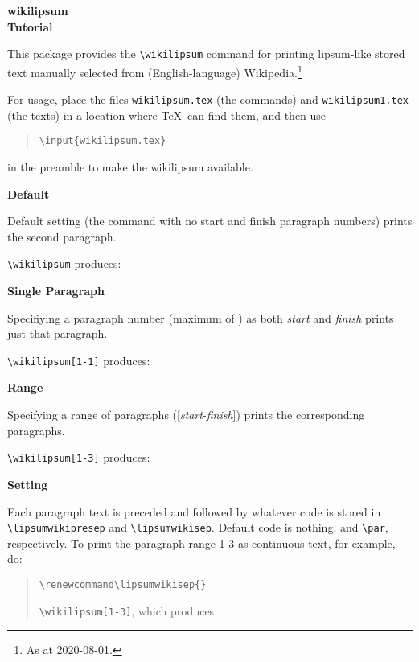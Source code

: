 \documentclass{article}
\newcommand\cmdwl[1]{\texttt{\textbackslash #1}}
\begin{document}
\begin{center}
\bfseries wikilipsum\\
 Tutorial
\end{center}
This package provides the \cmdwl{wikilipsum} command for printing lipsum-like stored text manually selected from (English-language) Wikipedia.\footnote{As at 2020-08-01.} 

For usage, place the files  \texttt{wikilipsum.tex} (the commands) and \texttt{wikilipsum1.tex} (the texts) in a location where \TeX\ can find them, and then use 
\begin{quotation}
\texttt{\cmdwl{input}\{wikilipsum.tex\}} 
\end{quotation}
in the preamble to make the wikilipsum available.
\bigskip

\textbf{Default}

Default setting (the command with no start and finish paragraph numbers) prints the second paragraph.

\cmdwl{wikilipsum} produces:

\begin{quotation}\sffamily\small
\wikilipsum
\end{quotation}
\bigskip

\textbf{Single Paragraph}

Specifiying a paragraph number (maximum of \maxwikilipsum) as both \textit{start} and \textit{finish} prints just that paragraph.

\cmdwl{wikilipsum[1-1]} produces:
\begin{quotation}\sffamily\small
\wikilipsum[1-1]
\end{quotation}
\bigskip

\textbf{Range}

Specifying a range of paragraphs ([\textit{start}-\textit{finish}]) prints the corresponding paragraphs.

\cmdwl{wikilipsum[1-3]} produces:
\begin{quotation}\sffamily\small
\wikilipsum[1-3]
\end{quotation}


\textbf{Setting}

Each paragraph text is preceded and followed by whatever code is stored in \cmdwl{lipsumwikipresep} and \cmdwl{lipsumwikisep}. Default code is nothing, and \cmdwl{par}, respectively. To print the paragraph range 1-3 as continuous text, for example, do:
\begin{quotation}
\texttt{\textbackslash renewcommand\textbackslash lipsumwikisep\{\}}\par
\cmdwl{wikilipsum[1-3]}, which produces:\par
\begin{quotation}\sffamily\small\renewcommand\lipsumwikisep{}\wikilipsum[1-3]\end{quotation}
\end{quotation}
\end{document}
